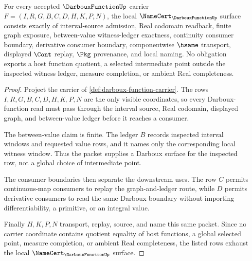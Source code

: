 \begin{theorem}
\label{thm:darboux-function-namecert-obligations}
For every accepted $\DarbouxFunctionUp$ carrier $F=(I,R,G,B,C,D,H,K,P,N)$, the local $\NameCert_{\DarbouxFunctionUp}$ surface consists exactly of interval-source admission, Real codomain readback, finite graph exposure, between-value witness-ledger exactness, continuity consumer boundary, derivative consumer boundary, componentwise $\hsame$ transport, displayed $\Cont$ replay, $\Pkg$ provenance, and local naming. No obligation exports a host function quotient, a selected intermediate point outside the inspected witness ledger, measure completion, or ambient Real completeness.
\end{theorem}
\begin{proof}
Project the carrier of \autoref{def:darboux-function-carrier}. The rows $I,R,G,B,C,D,H,K,P,N$ are the only visible coordinates, so every Darboux-function read must pass through the interval source, Real codomain, displayed graph, and between-value ledger before it reaches a consumer.

The between-value claim is finite. The ledger $B$ records inspected interval windows and requested value rows, and it names only the corresponding local witness window. Thus the packet supplies a Darboux surface for the inspected row, not a global choice of intermediate point.

The consumer boundaries then separate the downstream uses. The row $C$ permits continuous-map consumers to replay the graph-and-ledger route, while $D$ permits derivative consumers to read the same Darboux boundary without importing differentiability, a primitive, or an integral value.

Finally $H,K,P,N$ transport, replay, source, and name this same packet. Since no carrier coordinate contains quotient equality of host functions, a global selected point, measure completion, or ambient Real completeness, the listed rows exhaust the local $\NameCert_{\DarbouxFunctionUp}$ surface.
\end{proof}



